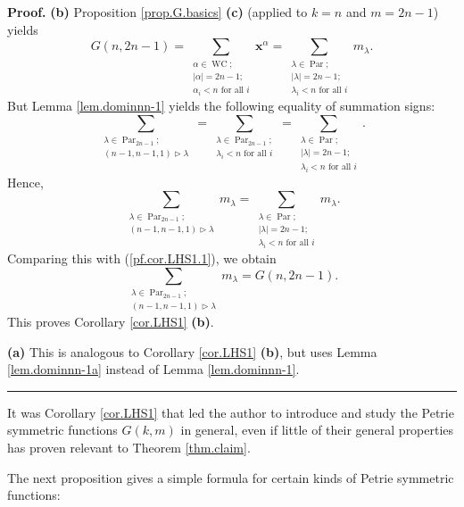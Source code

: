 \documentclass[numbers=enddot,12pt,final,onecolumn,notitlepage]{scrartcl}%
\theoremstyle{definition}
\newenvironment{proof}[1][Proof]{\noindent\textbf{#1.} }{\ \rule{0.5em}{0.5em}}
\let\sumnonlimits\sum
\renewcommand{\sum}{\sumnonlimits\limits}
\begin{document}
\begin{proof}
\textbf{(b)} Proposition \ref{prop.G.basics} \textbf{(c)} (applied to $k=n$
and $m=2n-1$) yields
\begin{equation}
G\left(  n,2n-1\right)  =\sum_{\substack{\alpha\in\operatorname*{WC}%
;\\\left\vert \alpha\right\vert =2n-1;\\\alpha_{i}<n\text{ for all }%
i}}\mathbf{x}^{\alpha}=\sum_{\substack{\lambda\in\operatorname*{Par}%
;\\\left\vert \lambda\right\vert =2n-1;\\\lambda_{i}<n\text{ for all }%
i}}m_{\lambda}. \label{pf.cor.LHS1.1}%
\end{equation}
But Lemma \ref{lem.dominnn-1} yields the following equality of summation
signs:%
\[
\sum_{\substack{\lambda\in\operatorname*{Par}\nolimits_{2n-1};\\\left(
n-1,n-1,1\right)  \triangleright\lambda}}=\sum_{\substack{\lambda
\in\operatorname*{Par}\nolimits_{2n-1};\\\lambda_{i}<n\text{ for all }i}%
}=\sum_{\substack{\lambda\in\operatorname*{Par};\\\left\vert \lambda
\right\vert =2n-1;\\\lambda_{i}<n\text{ for all }i}}.
\]
Hence,%
\[
\sum_{\substack{\lambda\in\operatorname*{Par}\nolimits_{2n-1};\\\left(
n-1,n-1,1\right)  \triangleright\lambda}}m_{\lambda}=\sum_{\substack{\lambda
\in\operatorname*{Par};\\\left\vert \lambda\right\vert =2n-1;\\\lambda
_{i}<n\text{ for all }i}}m_{\lambda}.
\]
Comparing this with (\ref{pf.cor.LHS1.1}), we obtain
\[
\sum_{\substack{\lambda\in\operatorname*{Par}\nolimits_{2n-1};\\\left(
n-1,n-1,1\right)  \triangleright\lambda}}m_{\lambda}=G\left(  n,2n-1\right)
.
\]
This proves Corollary \ref{cor.LHS1} \textbf{(b)}.

\textbf{(a)} This is analogous to Corollary \ref{cor.LHS1} \textbf{(b)}, but
uses Lemma \ref{lem.dominnn-1a} instead of Lemma \ref{lem.dominnn-1}.
\end{proof}

It was Corollary \ref{cor.LHS1} that led the author to introduce and study the
Petrie symmetric functions $G\left(  k,m\right)  $ in general, even if little
of their general properties has proven relevant to Theorem \ref{thm.claim}.

The next proposition gives a simple formula for certain kinds of Petrie
symmetric functions:
\end{document}
